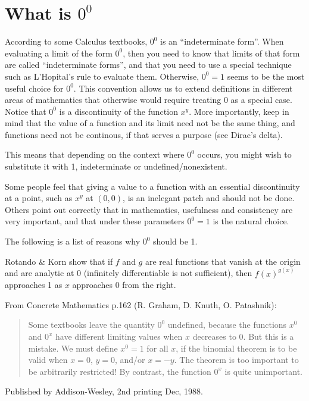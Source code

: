 \section{What is $0^0$}

  According to some Calculus textbooks, $0^0$ is an ``indeterminate
    form''. When evaluating a limit of the form $0^0$, then you need
    to know that limits of that form are called ``indeterminate forms'',
    and that you need to use a special technique such as L'Hopital's
    rule to evaluate them. Otherwise, $0^0=1$ seems to be the most
    useful choice for $0^0$. This convention allows us to extend
    definitions in different areas of mathematics that otherwise would
    require treating 0 as a special case. Notice that $0^0$ is a
    discontinuity of the function $x^y$. More importantly, keep
    in mind that the value of a function and its limit need not be the
    same thing, and functions need not be continous, if that serves
    a purpose (see Dirac's delta).


    This means that depending on the context where $0^0$ occurs, you
    might wish to substitute it with 1, indeterminate or
    undefined/nonexistent.

    Some people feel that giving a value to a function with an
    essential discontinuity at a point, such as $x^y$ at $(0,0)$, is
    an inelegant patch and should not be done. Others point out
    correctly that in mathematics, usefulness and consistency are
    very important, and that under these parameters $0^0=1$ is
    the natural choice.

    The following is a list of reasons why $0^0$ should be 1.

    Rotando \& Korn show that if $f$ and $g$ are real functions that vanish
    at the origin and are analytic at 0 (infinitely differentiable is
    not sufficient), then $f(x)^{g(x)}$ approaches 1 as $x$ approaches 0 from
    the right.

    From Concrete Mathematics p.162 (R. Graham, D. Knuth, O. Patashnik):
\begin{quote}
    Some textbooks leave the quantity $0^0$ undefined, because the
    functions $x^0$ and $0^x$ have different limiting values when $x$
    decreases to 0. But this is a mistake. We must define
       $x^0 = 1$ for all $x$,
    if the binomial theorem is to be valid when $x=0$, $y=0$, and/or $x=-y$.
    The theorem is too important to be arbitrarily restricted! By
    contrast, the function $0^x$ is quite unimportant.
\end{quote}
   Published by Addison-Wesley, 2nd printing Dec, 1988.

